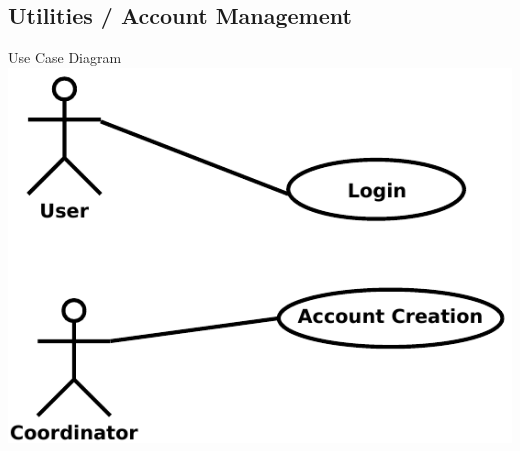 \documentclass{l3deliverable}
\begin{document}
\subsection{Utilities / Account Management}
Use Case Diagram\\
\includegraphics{Utilities.pdf}
\end{document}
